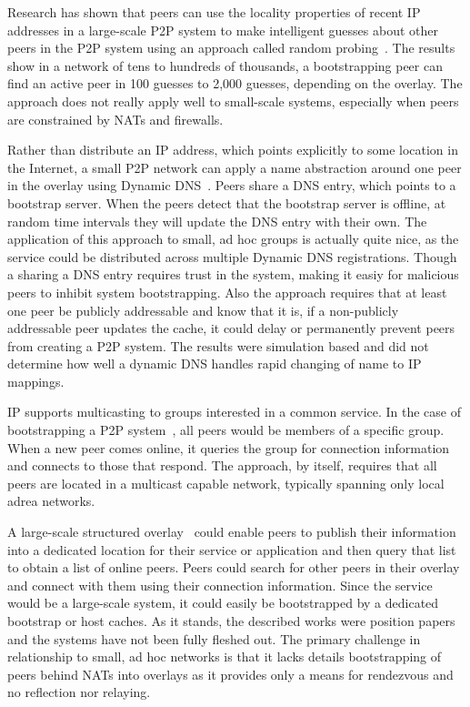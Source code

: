 \documentclass[conference]{IEEEtran}
\begin{document}
Research has shown that peers can use the locality properties of recent IP
addresses in a large-scale P2P system to make intelligent guesses about other
peers in the P2P system using an approach called random
probing~\cite{bootstrapping_p2p, locality_aware}.  The results show in a
network of tens to hundreds of thousands, a bootstrapping peer can find an
active peer in 100 guesses to 2,000 guesses, depending on the overlay.  The
approach does not really apply well to small-scale systems, especially when
peers are constrained by NATs and firewalls.

Rather than distribute an IP address, which points explicitly to some location
in the Internet, a small P2P network can apply a name abstraction around one
peer in the overlay using Dynamic DNS~\cite{bootstrapping_ddns}.  Peers share a
DNS entry, which points to a bootstrap server.  When the peers detect that the
bootstrap server is offline, at random time intervals they will update the DNS
entry with their own.  The application of this approach to small, ad hoc groups
is actually quite nice, as the service could be distributed across multiple
Dynamic DNS registrations.  Though a sharing a DNS entry requires trust in the
system, making it easiy for malicious peers to inhibit system bootstrapping.
Also the approach requires that at least one peer be publicly addressable and
know that it is, if a non-publicly addressable peer updates the cache, it could
delay or permanently prevent peers from creating a P2P system.  The results
were simulation based and did not determine how well a dynamic DNS handles
rapid changing of name to IP mappings.

IP supports multicasting to groups interested in a common service.  In the case
of bootstrapping a P2P system~\cite{pastry, locality_aware}, all peers would be
members of a specific group.  When a new peer comes online, it queries the
group for connection information and connects to those that respond.  The
approach, by itself, requires that all peers are located in a multicast capable
network, typically spanning only local adrea networks.

A large-scale structured overlay~\cite{one_ring, p2p_bootstrap} could enable
peers to publish their information into a dedicated location for their service
or application and then query that list to obtain a list of online peers.
Peers could search for other peers in their overlay and connect with them using
their connection information.  Since the service would be a large-scale system,
it could easily be bootstrapped by a dedicated bootstrap or host caches.  As it
stands, the described works were position papers and the systems have not been
fully fleshed out.  The primary challenge in relationship to small, ad hoc
networks is that it lacks details bootstrapping of peers behind NATs into
overlays as it provides only a means for rendezvous and no reflection nor
relaying.
\end{document}
